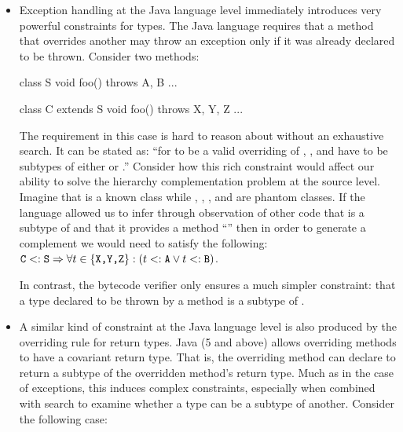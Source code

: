\begin{itemize}[--]
\item Exception handling at the Java language level immediately
  introduces very powerful constraints for types. The Java language
  requires that a method that overrides another may throw an exception
  only if it was already declared to be thrown. Consider two methods:

  \begin{javacode}
    class S {
      void foo() throws A, B {...}
    }

    class C  extends S {
      void foo() throws X, Y, Z {...}
    }
  \end{javacode}

  The requirement in this case is hard to reason about without an
  exhaustive search. It can be stated as: ``for  to be a
  valid overriding of , ,  and 
  have to be subtypes of either  or .''  Consider how
  this rich constraint would affect our ability to solve the hierarchy
  complementation problem at the source level. Imagine that 
  is a known class while , , , and 
  are phantom classes. If the language allowed us to infer through
  observation of other code that  is a subtype of  and
  that it provides a method ``'' then
  in order to generate a complement we would need to satisfy the
  following:
  $\texttt{C} <: \texttt{S} \Rightarrow \forall t \in \{\texttt{X,Y,Z}\}: (t
  <: \texttt{A} \lor t <: \texttt{B})$.


  In contrast, the bytecode verifier only ensures a much simpler
  constraint: that a type declared to be thrown by a method is a
  subtype of .

\item A similar kind of constraint at the Java language level is also
  produced by the overriding rule for return types. Java (5 and above)
  allows overriding methods to have a covariant return type. That is,
  the overriding method can declare to return a subtype of the
  overridden method's return type. Much as in the case of exceptions,
  this induces complex constraints, especially when combined with
  search to examine whether a type can be a subtype of another.
  Consider the following case:


\end{itemize}

